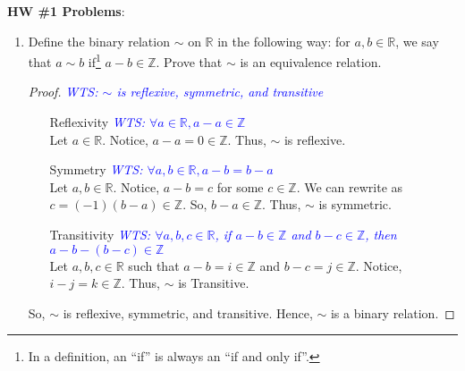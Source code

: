 \documentclass[12pt]{article}
\newcommand{\R}{\mathbb{R}}
\newcommand{\Z}{\mathbb{Z}}
\newcommand{\wts}[1]{\textit{\textcolor{blue}{WTS: #1}}\\}
\begin{document}
\textbf{HW \#1 Problems}:
\begin{enumerate}
 
\item Define the binary relation $\sim$ on $\mathbb{R}$ in the following way: for $a,b \in \mathbb{R}$, we say that $a \sim b$ if\footnote{In a definition, an ``if'' is always an ``if and only if''.} $a-b \in \mathbb{Z}$. Prove that $\sim$ is an equivalence relation.
\begin{proof}\wts{$ \sim $ is reflexive, symmetric, and transitive}
	\begin{enumerate}
		\item[Reflexivity]
		\wts{$\forall a \in \R, a-a \in \Z $}
		Let $ a\in\R $. Notice, $ a-a=0\in\Z $. Thus, $ \sim $ is reflexive.
		\item[Symmetry]
		\wts{$\forall a,b\in\R, a-b=b-a$}
		Let $ a,b\in\R $. Notice, $ a-b=c $ for some $ c\in\Z $. We can rewrite as $ c=(-1)(b-a)\in\Z $. So, $ b-a\in\Z $. Thus, $ \sim $ is symmetric.
		\item[Transitivity]
		\wts{$\forall a,b,c\in\R$, if $ a-b\in\Z $ and $ b-c\in\Z $, then $ a-b-(b-c)\in\Z $}
		Let $ a,b,c\in\R $ such that $ a-b=i\in\Z$ and $ b-c=j\in\Z $. Notice, $ i-j=k\in\Z $. Thus, $ \sim $ is Transitive.
	\end{enumerate}
	So, $ \sim $ is reflexive, symmetric, and transitive. Hence, $ \sim $ is a binary relation.
\end{proof}



\end{enumerate}
\end{document}
